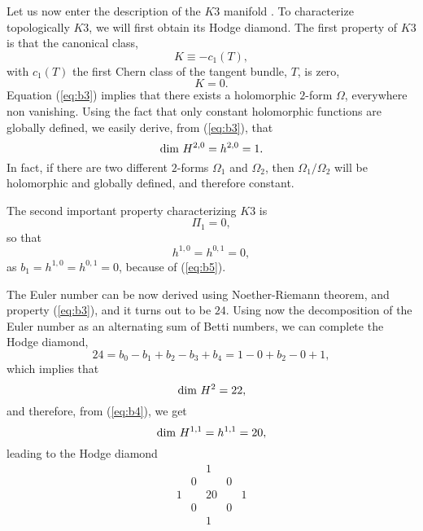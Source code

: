 Let us now enter the description of the $K3$ manifold \cite{GrHa,Aspinwall,Persson}. To
characterize topologically $K3$, we will first obtain its Hodge
diamond. The first property of $K3$ is that the canonical class,
\begin{equation}
K \equiv - c_1(T),
\label{eq:b2}
\end{equation}
with $c_1(T)$ the first Chern class of the tangent bundle, $T$,
is zero,
\begin{equation}
K=0.
\label{eq:b3}
\end{equation}
Equation (\ref{eq:b3}) implies that there exists a holomorphic
$2$-form $\Omega$, everywhere non vanishing. Using the fact that only
constant holomorphic functions are globally defined, we easily
derive, from (\ref{eq:b3}), that
\begin{equation}
\hbox{dim } H^{2,0}=h^{2,0}=1.
\label{eq:b4}
\end{equation}
In fact, if there are two different $2$-forms $\Omega_1$ and
$\Omega_2$, then $\Omega_1/\Omega_2$ will be holomorphic and
globally defined, and therefore constant. 
  
The second important property characterizing $K3$ is 
\begin{equation}
\Pi_1 = 0,
\label{eq:b5}
\end{equation}
so that
\begin{equation}
h^{1,0}=h^{0,1}=0,
\label{eb:b6}
\end{equation}
as $b_1=h^{1,0}=h^{0,1}=0$, because of (\ref{eq:b5}). 
  
The Euler number can be now derived using Noether-Riemann
theorem, and property (\ref{eq:b3}), and it turns out to be $24$.
Using now the decomposition of the Euler number as an
alternating sum of Betti numbers, we can complete the Hodge
diamond,
\begin{equation}
24 = b_0 - b_1 + b_2 - b_3 +b_4 = 1 -0 +b_2 -0 +1,
\label{eq:b7}
\end{equation}
which implies that 
\begin{equation}
\hbox {dim } H^2 =22,
\label{eq:b8}
\end{equation}
and therefore, from (\ref{eq:b4}), we get 
\begin{equation}
\hbox {dim } H^{1,1} =h^{1,1}=20,
\label{eq:b9}
\end{equation}
leading to the Hodge diamond
\begin{equation}
\begin{array}{ccccc}  &   & 1  &   &    \\
					      & 0  &   & 0  &    \\
					    1  &   & 20 &   & 1  \\
					      & 0  &   & 0    &    \\
					      &   & 1 &     & 
	\end{array}
\label{eq:b10}
\end{equation}
  
